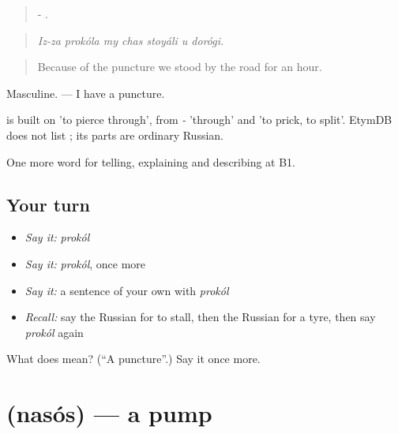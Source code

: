 \begin{quote}
-      .
\end{quote}

\begin{quote}
\emph{Iz-za prokóla my chas stoyáli u dorógi.}
\end{quote}

\begin{quote}
Because of the puncture we stood by the road for an hour.
\end{quote}

Masculine. \emph{  } — I have a puncture.

\begin{cousinweb}
\emph{} is built on \emph{} 'to pierce through', from \emph{-} 'through' and \emph{} 'to prick, to split'. EtymDB does not list \emph{}; its parts are ordinary Russian.
\end{cousinweb}

\begin{grammarlens}[title={What you've built}]
One more word for telling, explaining and describing at B1.
\end{grammarlens}

\subsection*{Your turn}
\begin{itemize}
\raggedright
  \item \emph{Say it:} \emph{prokól}
  \item \emph{Say it:} \emph{prokól}, once more
  \item \emph{Say it:} a sentence of your own with \emph{prokól}
  \item \emph{Recall:} say the Russian for to stall, then the Russian for a tyre, then say \emph{prokól} again
\end{itemize}

\begin{tcolorbox}[breakable,colback=teal!4,colframe=teal!35!black,title={Before you move on}]
What does  mean? (\textquotedblleft{}A puncture\textquotedblright{}.) Say it once more.
\end{tcolorbox}
\section[\texorpdfstring{\ru{насос} (nasós)}{насос (nasós)}]{ (nasós) — a pump}

